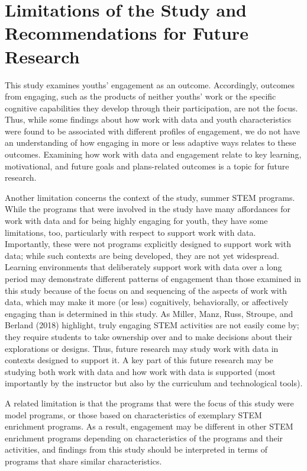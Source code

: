 \documentclass[]{book}
\theoremstyle{definition}
\theoremstyle{definition}
\theoremstyle{definition}
\theoremstyle{remark}
\begin{document}
\section{Limitations of the Study and Recommendations for Future
Research}\label{limitations-of-the-study-and-recommendations-for-future-research}

This study examines youths' engagement as an outcome. Accordingly,
outcomes from engaging, such as the products of neither youths' work or
the specific cognitive capabilities they develop through their
participation, are not the focus. Thus, while some findings about how
work with data and youth characteristics were found to be associated
with different profiles of engagement, we do not have an understanding
of how engaging in more or less adaptive ways relates to these outcomes.
Examining how work with data and engagement relate to key learning,
motivational, and future goals and plans-related outcomes is a topic for
future research.

Another limitation concerns the context of the study, summer STEM
programs. While the programs that were involved in the study have many
affordances for work with data and for being highly engaging for youth,
they have some limitations, too, particularly with respect to support
work with data. Importantly, these were not programs explicitly designed
to support work with data; while such contexts are being developed, they
are not yet widespread. Learning environments that deliberately support
work with data over a long period may demonstrate different patterns of
engagement than those examined in this study because of the focus on and
sequencing of the aspects of work with data, which may make it more (or
less) cognitively, behaviorally, or affectively engaging than is
determined in this study. As Miller, Manz, Russ, Stroupe, and Berland
(2018) highlight, truly engaging STEM activities are not easily come by;
they require students to take ownership over and to make decisions about
their explorations or designs. Thus, future research may study work with
data in contexts designed to support it. A key part of this future
research may be studying both work with data and how work with data is
supported (most importantly by the instructor but also by the curriculum
and technological tools).

A related limitation is that the programs that were the focus of this
study were model programs, or those based on characteristics of
exemplary STEM enrichment programs. As a result, engagement may be
different in other STEM enrichment programs depending on characteristics
of the programs and their activities, and findings from this study
should be interpreted in terms of programs that share similar
characteristics.
\end{document}
